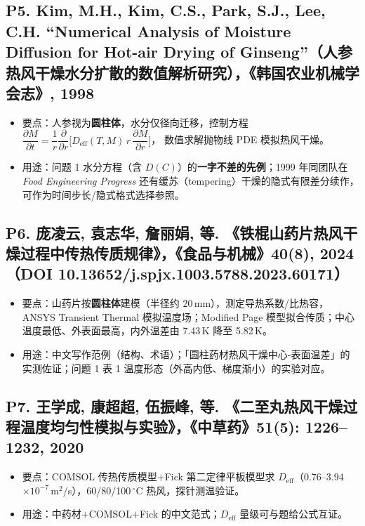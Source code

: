 \documentclass[12pt,a4paper]{ctexart}
\begin{document}
\subsection{P5. Kim, M.H., Kim, C.S., Park, S.J., Lee, C.H. ``Numerical Analysis of Moisture Diffusion for Hot-air Drying of Ginseng''（人参热风干燥水分扩散的数值解析研究），《韩国农业机械学会志》, 1998}
\begin{itemize}
\item 要点：人参视为\textbf{圆柱体}，水分仅径向迁移，控制方程
$\dfrac{\partial M}{\partial t}=\dfrac{1}{r}\dfrac{\partial}{\partial r}\Big[D_{\mathrm{eff}}(T,M)\,r\,\dfrac{\partial M}{\partial r}\Big]$，
数值求解抛物线 PDE 模拟热风干燥。
\item 用途：问题 1 水分方程（含 $D(C)$）的\textbf{一字不差的先例}；1999 年同团队在 \textit{Food Engineering Progress} 还有缓苏（tempering）干燥的隐式有限差分续作，可作为时间步长/隐式格式选择参照。
\end{itemize}

\subsection{P6. 庞凌云, 袁志华, 詹丽娟, 等. 《铁棍山药片热风干燥过程中传热传质规律》，《食品与机械》40(8), 2024（DOI 10.13652/j.spjx.1003.5788.2023.60171）}
\begin{itemize}
\item 要点：山药片按\textbf{圆柱体}建模（半径约 20\,mm），测定导热系数/比热容，ANSYS Transient Thermal 模拟温度场；Modified Page 模型拟合传质；中心温度最低、外表面最高，内外温差由 7.43\,K 降至 5.82\,K。
\item 用途：中文写作范例（结构、术语）；「圆柱药材热风干燥中心-表面温差」的实测佐证；问题 1 表 1 温度形态（外高内低、梯度渐小）的实验对应。
\end{itemize}

\subsection{P7. 王学成, 康超超, 伍振峰, 等. 《二至丸热风干燥过程温度均匀性模拟与实验》，《中草药》51(5): 1226--1232, 2020}
\begin{itemize}
\item 要点：COMSOL 传热传质模型$+$Fick 第二定律平板模型求 $D_{\mathrm{eff}}$（0.76--3.94$\times10^{-7}$\,m$^2$/s），60/80/100\,$^\circ$C 热风，探针测温验证。
\item 用途：中药材$+$COMSOL$+$Fick 的中文范式；$D_{\mathrm{eff}}$ 量级可与题给公式互证。
\end{itemize}
\end{document}
